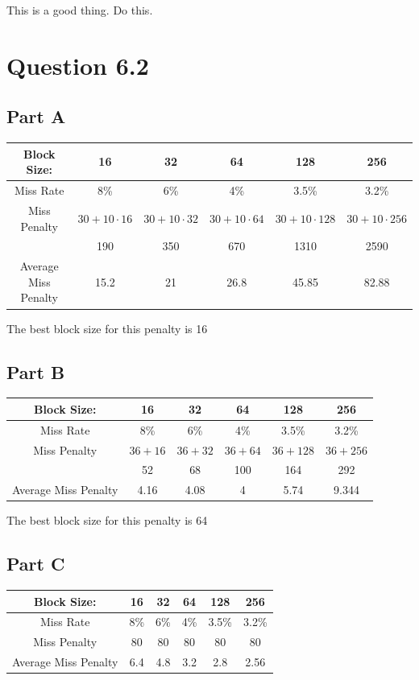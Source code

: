 \documentclass[11pt]{article} %
\begin{document}
This is a good thing. Do this.

\section{Question 6.2}

\subsection{Part A}

\begin{tabular}{|c|c|c|c|c|c|}\hline
Block Size: & 16 & 32 & 64 & 128 & 256\\\hline
Miss Rate & 8\% & 6\% & 4\% & 3.5\% & 3.2\%\\\hline
Miss Penalty & $30+10\cdot 16$ & $30+10\cdot 32$ & $30+10\cdot 64$ & $30+10\cdot 128$ & $30+10\cdot 256$ \\
& 190 & 350 & 670 & 1310 & 2590 \\\hline
Average Miss Penalty & 15.2 & 21 & 26.8 & 45.85 & 82.88\\\hline
\end{tabular}

The best block size for this penalty is 16

\subsection{Part B}

\begin{tabular}{|c|c|c|c|c|c|}\hline
Block Size: & 16 & 32 & 64 & 128 & 256\\\hline
Miss Rate & 8\% & 6\% & 4\% & 3.5\% & 3.2\%\\\hline
Miss Penalty & $36 + 16$ & $36+ 32$ & $36+ 64$ & $36+128$ & $36+ 256$ \\
& 52 & 68 & 100 & 164 & 292 \\\hline
Average Miss Penalty & 4.16 & 4.08 & 4 & 5.74 & 9.344 \\\hline
\end{tabular}

The best block size for this penalty is 64

\subsection{Part C}

\begin{tabular}{|c|c|c|c|c|c|}\hline
Block Size: & 16 & 32 & 64 & 128 & 256\\\hline
Miss Rate & 8\% & 6\% & 4\% & 3.5\% & 3.2\%\\\hline
Miss Penalty & 80 & 80 & 80 & 80 & 80 \\\hline
Average Miss Penalty & 6.4 & 4.8 & 3.2 & 2.8 & 2.56 \\\hline
\end{tabular}
\end{document}
